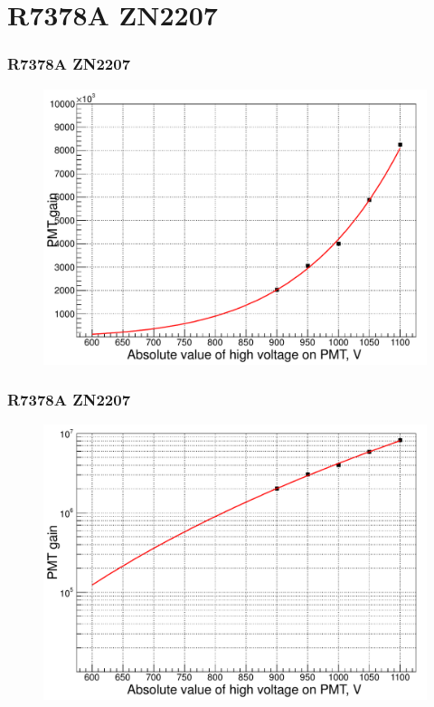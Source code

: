 \documentclass{beamer}
\begin{document}
\section{R7378A ZN2207}
\begin{frame}
\frametitle{R7378A ZN2207}
\begin{figure}
  \includegraphics[width=0.95\linewidth]{./pmtGainR7378A_ZN2207.pdf}
\end{figure}
\end{frame}
\begin{frame}
\frametitle{R7378A ZN2207}
\begin{figure}
  \includegraphics[width=0.95\linewidth]{./pmtGainR7378A_ZN2207_log.pdf}
\end{figure}
\end{frame}
\end{document}

